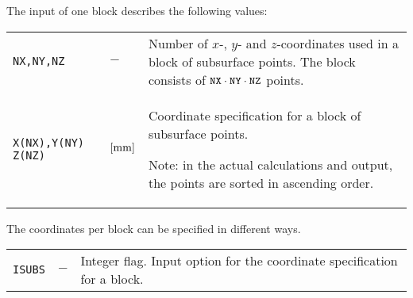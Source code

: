 \documentclass[12pt]{report}
\newenvironment{inputvars}{\vspace{0.4\baselineskip}%

\begin{tabular}{>{\raggedright}p{22mm}p{19mm}p{113mm}}}{
\end{tabular}

}
\newcommand{\inpvar}[3]{{\small\tt #1} & $#2$ & #3 \\[1ex]}
\begin{document}
The input of one block describes the following values:
\begin{inputvars}
\inpvar{\tt NX,NY,NZ}{-}{Number of $x$-, $y$- and $z$-coordinates used in
        a block of subsurface points. The block consists of ${\tt NX}\cdot
        {\tt NY}\cdot{\tt NZ}$ points.}
\inpvar{X(NX),\mbox{Y(NY)\hspace{-1ex}} Z(NZ)}{\bunit{mm}}{Coordinate
        specification for a block of subsurface points.

        Note: in the actual calculations and output, the points are
        sorted in ascending order.}
\end{inputvars}
The coordinates per block can be specified in different ways.
\begin{inputvars}
\inpvar{\tt ISUBS}{-}{Integer flag. Input option for the coordinate
        specification for a block.}
\end{inputvars}
\end{document}
